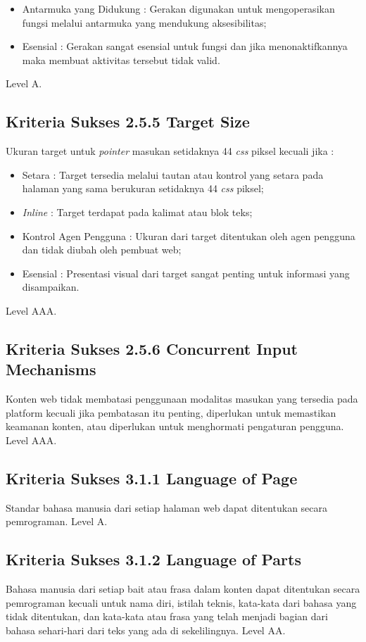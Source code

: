 \begin{itemize}
	\item Antarmuka yang Didukung : Gerakan digunakan untuk mengoperasikan fungsi melalui antarmuka yang mendukung aksesibilitas;
	\item Esensial : Gerakan sangat esensial untuk fungsi dan jika menonaktifkannya maka membuat aktivitas tersebut tidak valid.
\end{itemize}

Level A.

\subsection{Kriteria Sukses 2.5.5 Target Size}
\label{sec:kriteria_2.5.5}
Ukuran target untuk \textit{pointer} masukan setidaknya 44 \textit{css} piksel kecuali jika :

\begin{itemize}
	\item Setara : Target tersedia melalui tautan atau kontrol yang setara pada halaman yang sama berukuran setidaknya 44 \textit{css} piksel;
	\item \textit{Inline} : Target terdapat pada kalimat atau blok teks;
	\item Kontrol Agen Pengguna : Ukuran dari target ditentukan oleh agen pengguna dan tidak diubah oleh pembuat web;
	\item Esensial : Presentasi visual dari target sangat penting untuk informasi yang disampaikan.
\end{itemize}

Level AAA.

\subsection{Kriteria Sukses 2.5.6 Concurrent Input Mechanisms}
\label{sec:kriteria_2.5.6}
Konten web tidak membatasi penggunaan modalitas masukan yang tersedia pada platform kecuali jika pembatasan itu penting, diperlukan untuk memastikan keamanan konten, atau diperlukan untuk menghormati pengaturan pengguna.
Level AAA.

\subsection{Kriteria Sukses 3.1.1 Language of Page}
\label{sec:kriteria_3.1.1}
Standar bahasa manusia dari setiap halaman web dapat ditentukan secara pemrograman.
Level A.

\subsection{Kriteria Sukses 3.1.2 Language of Parts}
\label{sec:kriteria_3.1.2}
Bahasa manusia dari setiap bait atau frasa dalam konten dapat ditentukan secara pemrograman kecuali untuk nama diri, istilah teknis, kata-kata dari bahasa yang tidak ditentukan, dan kata-kata atau frasa yang telah menjadi bagian dari bahasa sehari-hari dari teks yang ada di sekelilingnya.
Level AA.

